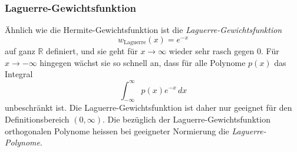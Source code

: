 %
%
\subsubsection{Laguerre-Gewichtsfunktion}
Ähnlich wie die Hermite-Gewichtsfunktion ist die
{\em Laguerre-Gewichtsfunktion}
%
\[
w_{\text{Laguerre}}(x)
=
e^{-x}
\]
auf ganz $\mathbb{R}$ definiert, und sie geht für $x\to\infty$ wieder
sehr rasch gegen $0$.
Für $x\to-\infty$ hingegen wächst sie so schnell an, dass für alle Polynome
$p(x)$ das Integral
\[
\int_{-\infty}^\infty p(x)e^{-x}\,dx
\]
unbeschränkt ist.
Die Laguerre-Gewichtsfunktion ist daher nur geeignet für den
Definitionsbereich $(0,\infty)$.
Die bezüglich der Laguerre-Gewichtsfunktion orthogonalen Polynome
heissen bei geeigneter Normierung die {\em Laguerre-Polynome}.
%

